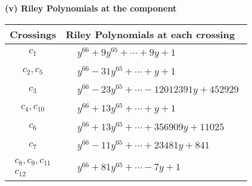 \documentclass[1p]{elsarticle_modified}
\theoremstyle{definition}
\begin{document}
\newpage\renewcommand{\arraystretch}{1}
\flushleft \textbf{(v) Riley Polynomials at the component}\newline \\
\begin{tabular}{m{50pt}|m{274pt}}
Crossings & \hspace{64pt}Riley Polynomials at each crossing \\
\hline $$\begin{aligned}c_{1}\end{aligned}$$&$\begin{aligned}
&y^{66}+9 y^{65}+\cdots+9 y+1
\end{aligned}$\\
\hline $$\begin{aligned}c_{2},c_{5}\end{aligned}$$&$\begin{aligned}
&y^{66}-31 y^{65}+\cdots+y+1
\end{aligned}$\\
\hline $$\begin{aligned}c_{3}\end{aligned}$$&$\begin{aligned}
&y^{66}-23 y^{65}+\cdots-12012391 y+452929
\end{aligned}$\\
\hline $$\begin{aligned}c_{4},c_{10}\end{aligned}$$&$\begin{aligned}
&y^{66}+13 y^{65}+\cdots+y+1
\end{aligned}$\\
\hline $$\begin{aligned}c_{6}\end{aligned}$$&$\begin{aligned}
&y^{66}+13 y^{65}+\cdots+356909 y+11025
\end{aligned}$\\
\hline $$\begin{aligned}c_{7}\end{aligned}$$&$\begin{aligned}
&y^{66}-11 y^{65}+\cdots+23481 y+841
\end{aligned}$\\
\hline $$\begin{aligned}c_{8},c_{9},c_{11}\\c_{12}\end{aligned}$$&$\begin{aligned}
&y^{66}+81 y^{65}+\cdots-7 y+1
\end{aligned}$\\
\hline
\end{tabular}\\~\\
\end{document}
